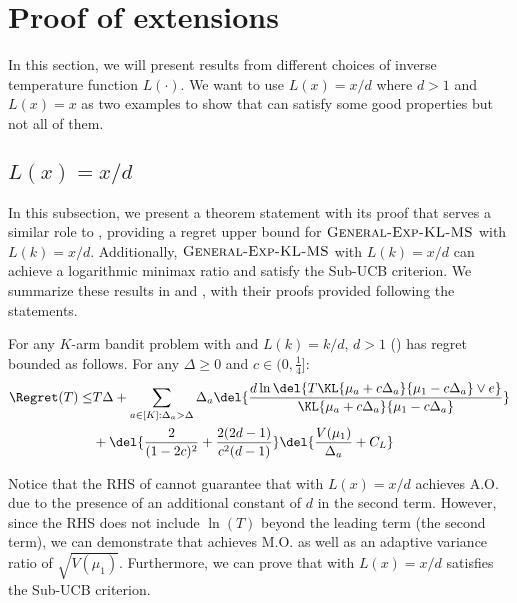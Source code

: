 \section{Proof of extensions} \label{sec:extensions}
In this section, we will present results from different choices of inverse temperature function $L(\cdot)$.
We want to use $L(x) = x/d$ where $d > 1$ and $L(x) = x$ as two examples to show that \expklms can satisfy some good properties but not all of them. 
\subsection{$L(x) = x/d$}
In this subsection, we present a theorem statement with its proof that serves a similar role to , providing a regret upper bound for $\textsc{General-Exp-KL-MS}$ with $L(k) = x/d$. Additionally, $\textsc{General-Exp-KL-MS}$ with $L(k) = x/d$ can achieve a logarithmic minimax ratio and satisfy the Sub-UCB criterion. We summarize these results in  and , with their proofs provided following the statements.

\begin{theorem} \label{thm:expected-regret-total-version-half}
    For any $K$-arm bandit problem with    and $L(k) = k/d$, $d > 1$ 
    \gexpklms () has regret bounded as follows. 
    For any $\Delta \geq 0$ and $c \in (0, \frac{1}{4}]$: 
    \begin{align}
        \Regret(T)
        \leq&
        T \Delta 
        + \sum_{a\in[K]: \Delta_a > \Delta} \Delta_a \del{\frac{d\ln\del{T\KL{\mu_a+c\Delta_a}{\mu_1-c\Delta_a} \vee e}}{\KL{\mu_a+c\Delta_a}{\mu_1-c\Delta_a}}}
            \nonumber
        \\
        &+ 
        \del{\frac{2}{(1-2c)^2} + \frac{2(2d-1)}{c^2(d-1)}} \del{\frac{V(\mu_1)}{\Delta_a} + C_L} 
            \label{eqn:exp-kl-ms-half-regret}
    \end{align}
\end{theorem}
Notice that the RHS of  cannot guarantee that \expklms with $L(x) = x/d$ achieves A.O. due to the presence of an additional constant of $d$ in the second term. However, since the RHS does not include $\ln(T)$ beyond the leading term (the second term), we can demonstrate that \expklms achieves M.O. as well as an adaptive variance ratio of $\sqrt{V(\mu_1)}$. Furthermore, we can prove that \expklms with $L(x) = x/d$ satisfies the Sub-UCB criterion.



